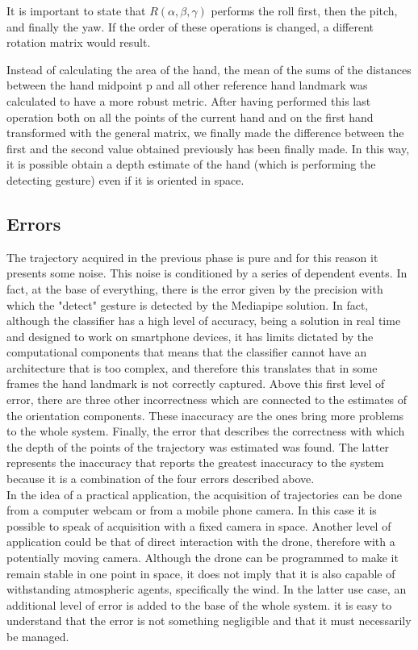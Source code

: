 \noindent It is important to state that $R(\alpha, \beta, \gamma)$ performs the roll first, then the pitch, and finally the yaw. If the order of these operations is changed, a different rotation matrix would result. 

\noindent Instead of calculating the area of the hand, the mean of the sums of the distances between the hand midpoint p and all other reference hand landmark was calculated to have a more robust metric. After having performed this last operation both on all the points of the current hand and on the first hand transformed with the general matrix, we finally made the difference between the first and the second value obtained previously has been finally made. In this way, it is possible obtain a depth estimate of the hand (which is performing the detecting gesture) even if it is oriented in space.

\subsection{Errors}
\label{sec:errors}
\noindent The trajectory acquired in the previous phase is pure and for this reason it presents some noise. This noise is conditioned by a series of dependent events. In fact, at the base of everything, there is the error given by the precision with which the "detect" gesture is detected by the Mediapipe solution. In fact, although the classifier has a high level of accuracy, being a solution in real time and designed to work on smartphone devices, it has limits dictated by the computational components that means that the classifier cannot have an architecture that is too complex, and therefore this translates that in some frames the hand landmark is not correctly captured. Above this first level of error, there are three other incorrectness which are connected to the estimates of the orientation components. These inaccuracy are the ones bring more problems to the whole system. Finally, the error that describes the correctness with which the depth of the points of the trajectory was estimated was found. The latter represents the inaccuracy that reports the greatest inaccuracy to the system because it is a combination of the four errors described above. \\

\noindent In the idea of a practical application, the acquisition of trajectories can be done from a computer webcam or from a mobile phone camera. In this case it is possible to speak of acquisition with a fixed camera in space. Another level of application could be that of direct interaction with the drone, therefore with a potentially moving camera. Although the drone can be programmed to make it remain stable in one point in space, it does not imply that it is also capable of withstanding atmospheric agents, specifically the wind. In the latter use case, an additional level of error is added to the base of the whole system. it is easy to understand that the error is not something negligible and that it must necessarily be managed.

